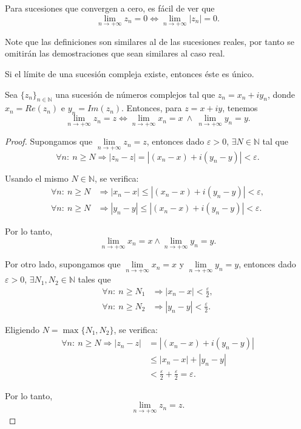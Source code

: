 Para sucesiones que convergen a cero, es fácil de ver que
$$\lim_{n\to + \infty} z_n = 0 \Leftrightarrow \lim_{n \to + \infty} |z_n| = 0.$$

Note que las definiciones son similares al de las sucesiones reales, por tanto se omitirán las demostraciones que sean similares al caso real.

\begin{propo}
Si el límite de una sucesión compleja existe, entonces éste es único.
\end{propo}

\begin{teorema} \label{SucesionCom-Re}
Sea $\{z_n\}_{n \in \mathbb{N}}$ una sucesión de números complejos tal que $z_n = x_n + iy_n$, donde $x_n=Re(z_n)$ e $y_n = Im(z_n)$. Entonces, para $z = x + iy$, tenemos
$$\lim_{n\to + \infty} z_n = z \Leftrightarrow \lim_{n\to + \infty} x_n = x ~\wedge~ \lim_{n\to + \infty} y_n = y.$$
\end{teorema}

\begin{proof}
Supongamos que $\lim\limits_{n\to + \infty} z_n = z$, entonces dado $\varepsilon >0 $, $\exists N \in \mathbb{N}$ tal que 
$$\forall n: ~ n \geq N \Rightarrow |z_n-z| = |(x_n-x) + i (y_n-y)| < \varepsilon.$$

Usando el mismo $N \in \mathbb{N}$, se verifica:
\begin{align*}
    \forall n:~ n \geq N &\Rightarrow |x_n-x| \leq  |(x_n-x) + i (y_n-y)| < \varepsilon, \\
    \forall n:~ n \geq N & \Rightarrow |y_n-y| \leq  |(x_n-x) + i (y_n-y)| < \varepsilon.
\end{align*}

Por lo tanto,
$$\lim_{n\to + \infty} x_n = x \wedge \lim_{n\to + \infty} y_n = y.$$

Por otro lado, supongamos que $\lim\limits_{n\to + \infty} x_n = x$ y $\lim\limits_{n\to + \infty} y_n = y$, entonces dado $\varepsilon > 0$, $\exists N_1, N_2 \in \mathbb{N}$ tales que
\begin{align*}
    \forall n:~ n \geq N_1 &\Rightarrow |x_n-x|  < \frac{\varepsilon}{2}, \\
    \forall n:~ n \geq N_2 &\Rightarrow |y_n-y| < \frac{\varepsilon}{2}.
\end{align*}

Eligiendo $N = \max\{N_1, N_2\}$, se verifica:
\begin{align*}
    \forall n: ~ n\geq N \Rightarrow |z_n-z| &=  |(x_n-x) + i (y_n-y)| \\
    &\leq |x_n-x| + |y_n-y| \\
    &< \frac{\varepsilon}{2} + \frac{\varepsilon}{2} = \varepsilon.
\end{align*}

Por lo tanto, 
$$\lim_{n\to + \infty} z_n = z.$$
\end{proof}


